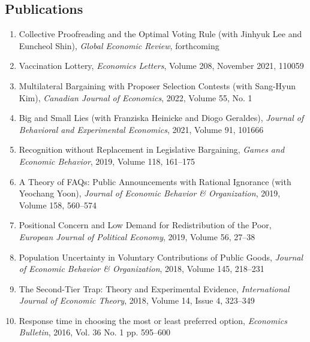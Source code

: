 \documentclass[margin, a4paper]{res}
\begin{document}
\begin{resume}
\section{Publications}
\begin{enumerate}[leftmargin=*]
\item Collective Proofreading and the Optimal Voting Rule (with Jinhyuk Lee and Euncheol Shin), \emph{Global Economic Review}, forthcoming
\item Vaccination Lottery, \emph{Economics Letters}, Volume 208, November 2021, 110059
\item Multilateral Bargaining with Proposer Selection Contests (with Sang-Hyun Kim), \emph{Canadian Journal of Economics}, 2022, Volume 55, No. 1
\item Big and Small Lies (with Franziska Heinicke and Diogo Geraldes), \emph{Journal of Behavioral and Experimental Economics}, 2021, Volume 91, 101666
\item Recognition without Replacement in Legislative Bargaining, \emph{Games and Economic Behavior}, 2019, Volume 118, 161--175
\item A Theory of FAQs: Public Announcements with Rational Ignorance (with Yeochang Yoon), \emph{Journal of Economic Behavior \& Organization}, 2019, Volume 158, 560--574
\item Positional Concern and Low Demand for Redistribution of the Poor, \emph{European Journal of Political Economy}, 2019, Volume 56, 27--38
\item Population Uncertainty in Voluntary Contributions of Public Goods, \emph{Journal of Economic Behavior \& Organization}, 2018, Volume 145, 218--231
\item The Second-Tier Trap: Theory and Experimental Evidence, \emph{International Journal of Economic Theory}, 2018, Volume 14, Issue 4, 323--349
\item Response time in choosing the most or least preferred option, \textit{Economics Bulletin}, 2016, Vol. 36 No. 1 pp. 595--600
\end{enumerate}


\end{resume}
\end{document}
